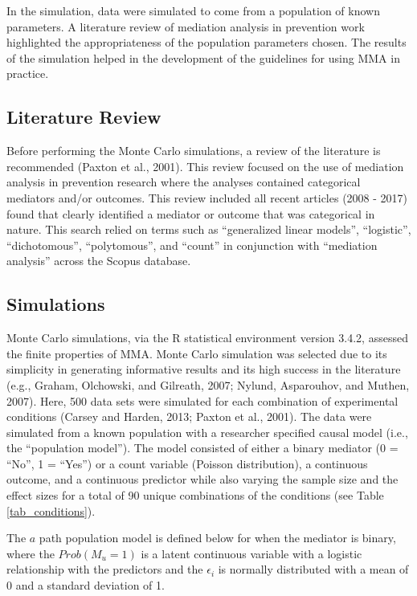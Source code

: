 \documentclass[]{DissertateUSU}
\begin{document}
In the simulation, data were simulated to come from a population of
known parameters. A literature review of mediation analysis in
prevention work highlighted the appropriateness of the population
parameters chosen. The results of the simulation helped in the
development of the guidelines for using MMA in practice.

\subsection{Literature Review}\label{literature-review-1}

Before performing the Monte Carlo simulations, a review of the
literature is recommended (Paxton et al., 2001). This review focused on
the use of mediation analysis in prevention research where the analyses
contained categorical mediators and/or outcomes. This review included
all recent articles (2008 - 2017) found that clearly identified a
mediator or outcome that was categorical in nature. This search relied
on terms such as ``generalized linear models'', ``logistic'',
``dichotomous'', ``polytomous'', and ``count'' in conjunction with
``mediation analysis'' across the Scopus database.

\subsection{Simulations}\label{simulations}

Monte Carlo simulations, via the R statistical environment version
3.4.2, assessed the finite properties of MMA. Monte Carlo simulation was
selected due to its simplicity in generating informative results and its
high success in the literature (e.g., Graham, Olchowski, and Gilreath,
2007; Nylund, Asparouhov, and Muthen, 2007). Here, 500 data sets were
simulated for each combination of experimental conditions (Carsey and
Harden, 2013; Paxton et al., 2001). The data were simulated from a known
population with a researcher specified causal model (i.e., the
``population model''). The model consisted of either a binary mediator
(0 = ``No'', 1 = ``Yes'') or a count variable (Poisson distribution), a
continuous outcome, and a continuous predictor while also varying the
sample size and the effect sizes for a total of 90 unique combinations
of the conditions (see Table \ref{tab_conditions}).

The \(a\) path population model is defined below for when the mediator
is binary, where the \(Prob(M_{u} = 1)\) is a latent continuous variable
with a logistic relationship with the predictors and the \(\epsilon_i\)
is normally distributed with a mean of 0 and a standard deviation of 1.
\end{document}
